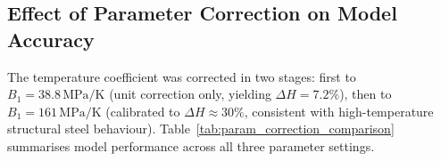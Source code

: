 \documentclass[a4paper,12pt]{report}
\begin{document}
\begin{CJK}{UTF8}{gbsn}
\section{Effect of Parameter Correction on Model Accuracy}
\label{sec:param_correction}

The temperature coefficient was corrected in two stages: first to
$B_1 = 38.8\,\mathrm{MPa/K}$ (unit correction only, yielding $\Delta H = 7.2\%$), then
to $B_1 = 161\,\mathrm{MPa/K}$ (calibrated to $\Delta H \approx 30\%$, consistent with
high-temperature structural steel behaviour). Table~\ref{tab:param_correction_comparison}
summarises model performance across all three parameter settings.

\begin{table}[H]
  \centering
  \caption{Test RMSE ($\times 10^{-3}$) across three parameter settings
    ($n = 3$ mean; normalised output space; $\Delta H$ denotes the percentage variation
    of $H(T)$ over $T\in[273,1000]\,\mathrm{K}$)}
  \label{tab:param_correction_comparison}
\end{table}


\end{CJK}
\end{document}
